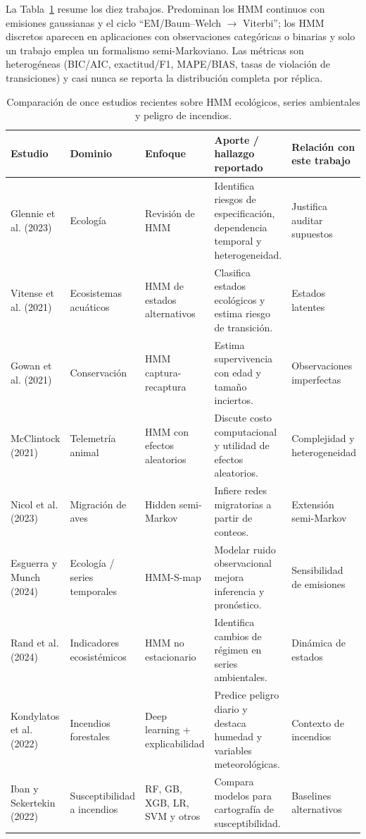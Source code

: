 \documentclass[11pt,letterpaper]{article}
\begin{document}
La Tabla~\ref{tab:comparativa} resume los diez trabajos. Predominan los HMM continuos con emisiones gaussianas y el ciclo ``EM/Baum--Welch \(\rightarrow\) Viterbi''; los HMM discretos aparecen en aplicaciones con observaciones categóricas o binarias y solo un trabajo emplea un formalismo semi-Markoviano. Las métricas son heterogéneas (BIC/AIC, exactitud/F1, MAPE/BIAS, tasas de violación de transiciones) y casi nunca se reporta la distribución completa por réplica.

\begin{table}[H]
\centering
\caption{Comparación de once estudios recientes sobre HMM ecológicos, series ambientales y peligro de incendios.}
\label{tab:comparativa}
\scriptsize
\setlength{\tabcolsep}{3pt}
\begin{tabularx}{\textwidth}{@{}p{2.5cm}p{2.1cm}X X p{2.5cm}@{}}
\toprule
Estudio & Dominio & Enfoque & Aporte / hallazgo reportado & Relación con este trabajo\\
\midrule
Glennie et al. (2023) & Ecología & Revisión de HMM & Identifica riesgos de especificación, dependencia temporal y heterogeneidad. & Justifica auditar supuestos\\
Vitense et al. (2021) & Ecosistemas acuáticos & HMM de estados alternativos & Clasifica estados ecológicos y estima riesgo de transición. & Estados latentes\\
Gowan et al. (2021) & Conservación & HMM captura-recaptura & Estima supervivencia con edad y tamaño inciertos. & Observaciones imperfectas\\
McClintock (2021) & Telemetría animal & HMM con efectos aleatorios & Discute costo computacional y utilidad de efectos aleatorios. & Complejidad y heterogeneidad\\
Nicol et al. (2023) & Migración de aves & Hidden semi-Markov & Infiere redes migratorias a partir de conteos. & Extensión semi-Markov\\
Esguerra y Munch (2024) & Ecología / series temporales & HMM-S-map & Modelar ruido observacional mejora inferencia y pronóstico. & Sensibilidad de emisiones\\
Rand et al. (2024) & Indicadores ecosistémicos & HMM no estacionario & Identifica cambios de régimen en series ambientales. & Dinámica de estados\\
Kondylatos et al. (2022) & Incendios forestales & Deep learning + explicabilidad & Predice peligro diario y destaca humedad y variables meteorológicas. & Contexto de incendios\\
Iban y Sekertekin (2022) & Susceptibilidad a incendios & RF, GB, XGB, LR, SVM y otros & Compara modelos para cartografía de susceptibilidad. & Baselines alternativos\\

\end{tabularx}
\end{table}
\end{document}
